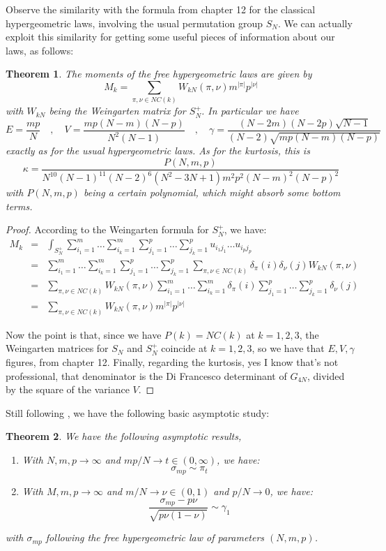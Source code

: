 \documentclass[12pt]{amsbook}
\newtheorem{theorem}{Theorem}[chapter]
\begin{document}
Observe the similarity with the formula from chapter 12 for the classical hypergeometric laws, involving the usual permutation group $S_N$. We can actually exploit this similarity for getting some useful pieces of information about our laws, as follows:

\begin{theorem}
The moments of the free hypergeometric laws are given by
$$M_k=\sum_{\pi,\nu\in NC(k)}W_{kN}(\pi,\nu)m^{|\pi|}p^{|\nu|}$$
with $W_{kN}$ being the Weingarten matrix for $S_N^+$. In particular we have
$$E=\frac{mp}{N}\quad,\quad V=\frac{mp(N-m)(N-p)}{N^2(N-1)}\quad,\quad 
\gamma=\frac{(N-2m)(N-2p)\sqrt{N-1}}{(N-2)\sqrt{mp(N-m)(N-p)}}$$
exactly as for the usual hypergeometric laws. As for the kurtosis, this is
$$\kappa=\frac{P(N,m,p)}{N^{10}(N-1)^{11}(N-2)^6(N^2-3N+1)m^2p^2(N-m)^2(N-p)^2}$$
with $P(N,m,p)$ being a certain polynomial, which might absorb some bottom terms.
\end{theorem}

\begin{proof}
According to the Weingarten formula for $S_N^+$, we have:
\begin{eqnarray*}
M_k
&=&\int_{S_N^+}\sum_{i_1=1}^m\ldots\sum_{i_k=1}^m
\sum_{j_1=1}^p\ldots\sum_{j_k=1}^pu_{i_1j_1}\ldots u_{i_pj_p}\\
&=&\sum_{i_1=1}^m\ldots\sum_{i_k=1}^m
\sum_{j_1=1}^p\ldots\sum_{j_k=1}^p
\sum_{\pi,\nu\in NC(k)}\delta_\pi(i)\delta_\nu(j)W_{kN}(\pi,\nu)\\
&=&\sum_{\pi,\nu\in NC(k)}W_{kN}(\pi,\nu)
\sum_{i_1=1}^m\ldots\sum_{i_k=1}^m\delta_\pi(i)
\sum_{j_1=1}^p\ldots\sum_{j_k=1}^p\delta_\nu(j)\\
&=&\sum_{\pi,\nu\in NC(k)}W_{kN}(\pi,\nu)m^{|\pi|}p^{|\nu|}
\end{eqnarray*}

Now the point is that, since we have $P(k)=NC(k)$ at $k=1,2,3$, the Weingarten matrices for $S_N$ and $S_N^+$ coincide at $k=1,2,3$, so we have that $E,V,\gamma$ figures, from chapter 12. Finally, regarding the kurtosis, yes I know that's not professional, that denominator is the Di Francesco determinant of $G_{4N}$, divided by the square of the variance $V$.
\end{proof}

Still following \cite{bbc}, we have the following basic asymptotic study:

\begin{theorem}
We have the following asymptotic results,
\begin{enumerate}
\item With $N,m,p\to\infty$ and $mp/N\to t\in(0,\infty)$, we have:
$$\sigma_{mp}\sim\pi_t$$

\item With $M,m,p\to\infty$ and $m/N\to\nu\in (0,1)$ and $p/N\to 0$, we have:
$$\frac{\sigma_{mp}-p\nu}{\sqrt{p\nu(1-\nu)}}\sim\gamma_1$$
\end{enumerate}
with $\sigma_{mp}$ following the free hypergeometric law of parameters $(N,m,p)$.
\end{theorem}
\end{document}
